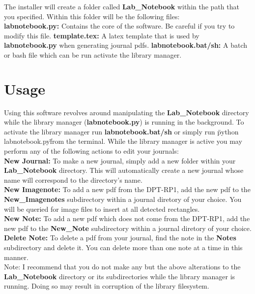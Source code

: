 \documentclass{article}
\begin{document}
The installer will create a folder called \textbf{Lab\_Notebook} within the path that you specified. Within this folder will be the following files:\\

\textbf{labnotebook.py:} Contains the core of the software. Be careful if you try to modify this file.
\textbf{template.tex:} A latex template that is used by \textbf{labnotebook.py} when generating journal pdfs.
\textbf{labnotebook.bat/sh:} A batch or bash file which can be run activate the library manager.

\section{Usage}

Using this software revolves around manipulating the \textbf{Lab\_Notebook} directory while the library manager (\textbf{labnotebook.py}) is running in the background. To activate the library manager run \textbf{labnotebook.bat/sh} or simply run \"python labnotebook.py\" from the terminal. While the library manager is active you may perform any of the following actions to edit your journals:\\

\textbf{New Journal:} To make a new journal, simply add a new folder within your \textbf{Lab\_Notebook} directory. This will automatically create a new journal whose name will correspond to the directory's name.\\

\textbf{New Imagenote:} To add a new pdf from the DPT-RP1, add the new pdf to the \textbf{New\_Imagenotes} subdirectory within a journal diretory of your choice. You will be queried for image files to insert at all detected rectangles.\\

\textbf{New Note:} To add a new pdf which does not come from the DPT-RP1, add the new pdf to the \textbf{New\_Note} subdirectory within a journal diretory of your choice.\\

\textbf{Delete Note:} To delete a pdf from your journal, find the note in the \textbf{Notes} subdirectory and delete it. You can delete more than one note at a time in this manner.\\

Note: I recommend that you do not make any but the above alterations to the \textbf{Lab\_Notebook} directory or its subdirectories while the library manager is running. Doing so may result in corruption of the library filesystem.
\end{document}
